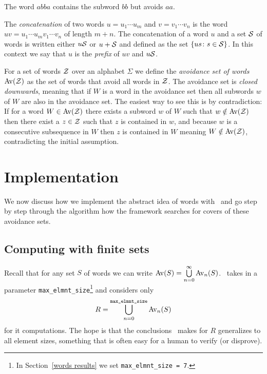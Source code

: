 \begin{example}
  The word $abba$ contains the subword $bb$ but avoids $aa$.
\end{example}

\begin{definition}
  The \emph{concatenation} of two words $u = u_1 \cdots u_m$ and $v = v_1 \cdots 
  v_n$ is the word $uv = u_1 \cdots u_m v_1 \cdots v_n$ of length $m+ n$. The 
  concatenation of a word $u$ and a set ${\mathcal{S}}$ of words is written either 
  $u{\mathcal{S}}$ or $u + {\mathcal{S}}$ and defined as the set $\{ us \colon s \in 
  {\mathcal{S}}\}$. In this context we say that $u$ is the \emph{prefix} of $uv$ and 
  $u{\mathcal{S}}$.
\end{definition}

For a set of words ${\mathcal{Z}}$ over an alphabet $\Sigma$ we define the 
\emph{avoidance set of words} ${\mathrm{Av}\!\left({\mathcal{Z}}\right)}$ as the set of words that avoid all 
words in ${\mathcal{Z}}$. The avoidance set is \emph{closed downwards}, meaning that if 
$W$ is a word in the avoidance set then all subwords $w$ of $W$ are also in the 
avoidance set. The easiest way to see this is by contradiction: If for a word 
$W \in {\mathrm{Av}\!\left({\mathcal{Z}}\right)}$ there exists a subword $w$ of $W$ such that $w \notin 
{\mathrm{Av}\!\left({\mathcal{Z}}\right)}$ then there exist a $z \in {\mathcal{Z}}$ such that $z$ is contained in 
$w$, and because $w$ is a consecutive subsequence in $W$ then $z$ is contained 
in $W$ meaning $W \notin {\mathrm{Av}\!\left({\mathcal{Z}}\right)}$, contradicting the initial assumption.


\section{Implementation\label{words implementation}}

We now discuss how we implement the abstract idea of words with \CombCov\ and
go step by step through the algorithm how the framework searches for covers of 
these avoidance sets.

\subsection{Computing with finite sets\label{computing with finite sets}}

Recall that for any set $S$ of words we can write ${\mathrm{Av}\!\left(S\right)} = 
\bigcup\limits_{n=0}^{\infty}{\mathrm{Av}_n\!\left(S\right)}$. \CombCov\ takes in a parameter 
\texttt{max\_elmnt\_size}\footnote{In Section~\ref{words results} we set 
\texttt{max\_elmnt\_size = 7}.} and considers only \[ R = 
\bigcup\limits_{n=0}^{\texttt{max\_elmnt\_size}}{\mathrm{Av}_n\!\left(S\right)} \] for it computations. 
The hope is that the conclusions \CombCov\ makes for $R$ generalizes to all 
element sizes, something that is often easy for a human to verify (or disprove).

